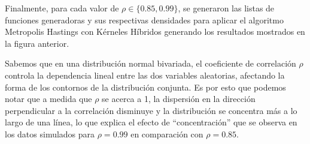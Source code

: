 Finalmente, para cada valor de $\rho \in \{0.85, 0.99\}$, se generaron las listas de funciones generadoras y sus respectivas densidades para aplicar el algoritmo Metropolis Hastings con Kérneles Híbridos generando los resultados mostrados en la figura anterior.

Sabemos que en una distribución normal bivariada, el coeficiente de correlación $\rho$ controla la dependencia lineal entre las dos variables aleatorias, afectando la forma de los contornos de la distribución conjunta. Es por esto que podemos notar que a medida que $\rho$ se acerca a 1, la dispersión en la dirección perpendicular a la correlación disminuye y la distribución se concentra más a lo largo de una línea, lo que explica el efecto de “concentración” que se observa en los datos simulados para $\rho = 0.99$ en comparación con $\rho = 0.85$.
